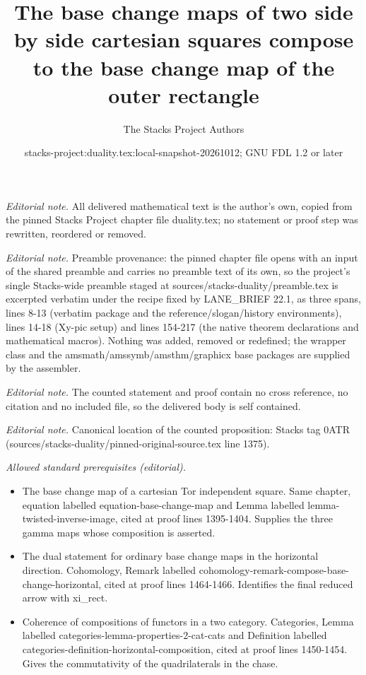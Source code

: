 \documentclass[10pt,a4paper]{amsart}
\title{The base change maps of two side by side cartesian squares compose to the base change map of the outer rectangle}
\author{The Stacks Project Authors}
\date{stacks-project:duality.tex:local-snapshot-20261012; GNU FDL 1.2 or later}
\theoremstyle{plain}
\theoremstyle{definition}
\theoremstyle{remark}
\numberwithin{equation}{subsection}
\begin{document}
\maketitle
\noindent\textit{Editorial note.} All delivered mathematical text is the author's own, copied from the pinned Stacks Project chapter file duality.tex; no statement or proof step was rewritten, reordered or removed.\par\medskip
\noindent\textit{Editorial note.} Preamble provenance: the pinned chapter file opens with an input of the shared preamble and carries no preamble text of its own, so the project's single Stacks-wide preamble staged at sources/stacks-duality/preamble.tex is excerpted verbatim under the recipe fixed by LANE\_BRIEF 22.1, as three spans, lines 8-13 (verbatim package and the reference/slogan/history environments), lines 14-18 (Xy-pic setup) and lines 154-217 (the native theorem declarations and mathematical macros). Nothing was added, removed or redefined; the wrapper class and the amsmath/amssymb/amsthm/graphicx base packages are supplied by the assembler.\par\medskip
\noindent\textit{Editorial note.} The counted statement and proof contain no cross reference, no citation and no included file, so the delivered body is self contained.\par\medskip
\noindent\textit{Editorial note.} Canonical location of the counted proposition: Stacks tag 0ATR (sources/stacks-duality/pinned-original-source.tex line 1375).\par\medskip
\noindent\textit{Allowed standard prerequisites (editorial).}\begin{itemize}
\item The base change map of a cartesian Tor independent square. Same chapter, equation labelled equation-base-change-map and Lemma labelled lemma-twisted-inverse-image, cited at proof lines 1395-1404. Supplies the three gamma maps whose composition is asserted.
\item The dual statement for ordinary base change maps in the horizontal direction. Cohomology, Remark labelled cohomology-remark-compose-base-change-horizontal, cited at proof lines 1464-1466. Identifies the final reduced arrow with xi\_rect.
\item Coherence of compositions of functors in a two category. Categories, Lemma labelled categories-lemma-properties-2-cat-cats and Definition labelled categories-definition-horizontal-composition, cited at proof lines 1450-1454. Gives the commutativity of the quadrilaterals in the chase.
\end{itemize}\medskip
\end{document}
